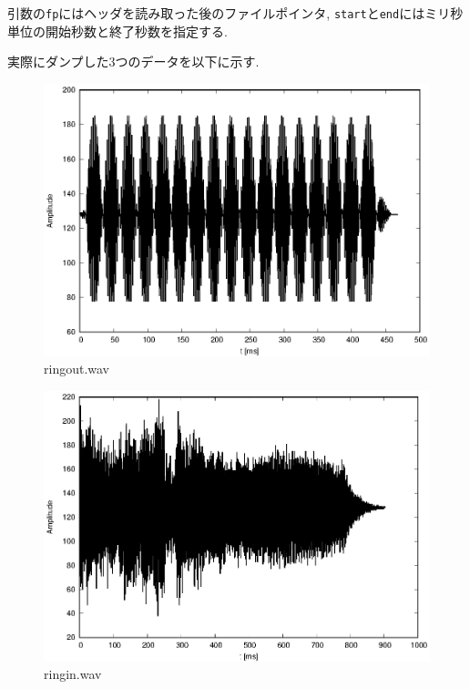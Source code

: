\documentclass[titlepage]{jsarticle}
\begin{document}
        引数の\verb|fp|にはヘッダを読み取った後のファイルポインタ,
        \verb|start|と\verb|end|にはミリ秒単位の開始秒数と終了秒数を指定する.

        実際にダンプした3つのデータを以下に示す.

        \begin{figure}[ht]
            \centering
            \includegraphics[width=12cm]{images/ringout.eps}
            \caption{ringout.wav}
            \label{fig:ringout}
        \end{figure}
        \begin{figure}[ht]
            \centering
            \includegraphics[width=12cm]{images/ringin.eps}
            \caption{ringin.wav}
            \label{fig:ringin}
        \end{figure}
\end{document}
